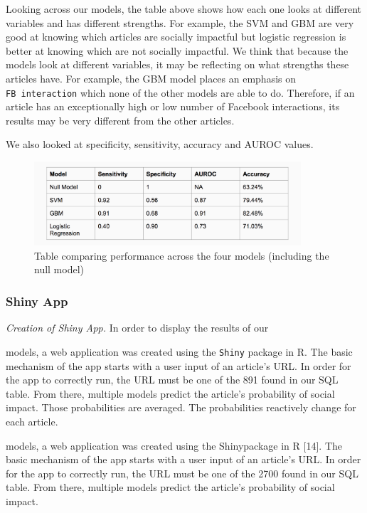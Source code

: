 \documentclass[10pt,letterpaper]{article}
\begin{document}
Looking across our models, the table above shows how each one looks at
different variables and has different strengths. For example, the SVM
and GBM are very good at knowing which articles are socially impactful
but logistic regression is better at knowing which are not socially
impactful. We think that because the models look at different variables,
it may be reflecting on what strengths these articles have. For example,
the GBM model places an emphasis on \texttt{FB\ interaction} which none
of the other models are able to do. Therefore, if an article has an
exceptionally high or low number of Facebook interactions, its results
may be very different from the other articles.

We also looked at specificity, sensitivity, accuracy and AUROC values.

\begin{figure}
\includegraphics[width=375px]{model-comp} \caption{Table comparing performance across the four models (including the null model)}\label{fig:unnamed-chunk-8}
\end{figure}

\subsubsection{Shiny App}\label{shiny-app}

\emph{Creation of Shiny App.} In order to display the results of our

models, a web application was created using the \texttt{Shiny} package
in R. The basic mechanism of the app starts with a user input of an
article's URL. In order for the app to correctly run, the URL must be
one of the 891 found in our SQL table. From there, multiple models
predict the article's probability of social impact. Those probabilities
are averaged. The probabilities reactively change for each article.

models, a web application was created using the Shinypackage in R
{[}14{]}. The basic mechanism of the app starts with a user input of an
article's URL. In order for the app to correctly run, the URL must be
one of the 2700 found in our SQL table. From there, multiple models
predict the article's probability of social impact.
\end{document}
